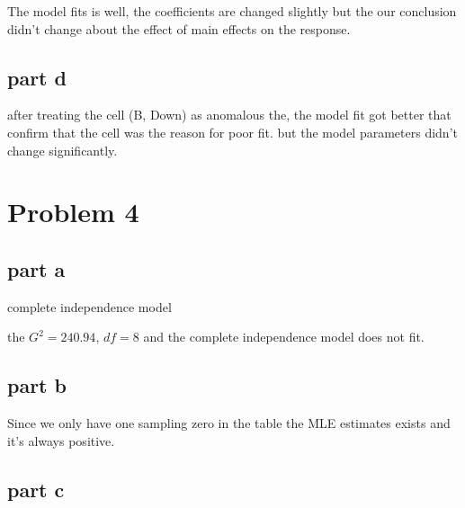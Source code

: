\documentclass[]{article}
\begin{document}
The model fits is well, the coefficients are changed slightly but the
our conclusion didn't change about the effect of main effects on the
response.

\subsection{part d}\label{part-d-1}

after treating the cell (B, Down) as anomalous the, the model fit got
better that confirm that the cell was the reason for poor fit. but the
model parameters didn't change significantly.

\section{Problem 4}\label{problem-4}

\subsection{part a}\label{part-a-2}

complete independence model

the \(G^2=240.94\), \(df=8\) and the complete independence model does
not fit.

\subsection{part b}\label{part-b-2}

Since we only have one sampling zero in the table the MLE estimates
exists and it's always positive.

\subsection{part c}\label{part-c-2}
\end{document}
